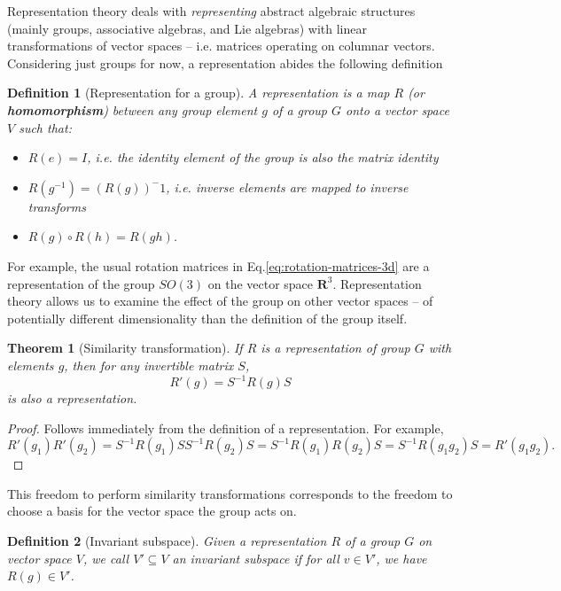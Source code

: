 \documentclass[11pt]{article}
\numberwithin{equation}{section}
\newtheorem{thm}{Theorem}[section]
\newtheorem{defn}{Definition}[section]
\begin{document}
Representation theory deals with \textit{representing} abstract algebraic structures (mainly groups, associative algebras, and Lie algebras) with linear transformations of vector spaces -- i.e. matrices operating on columnar vectors. Considering just groups for now, a representation abides the following definition
\begin{defn}[Representation for a group]
A representation is a map $R$ (or \textbf{homomorphism}) between any group element $g$ of a group $G$ onto a vector space $V$ such that:
\begin{itemize}[noitemsep]
\item $R(e) = I$, i.e. the identity element of the group is also the matrix identity
\item $R(g^{-1})=(R(g))^-1$, i.e. inverse elements are mapped to inverse transforms
\item $R(g) \circ R(h) = R(gh)$.
\end{itemize}
\end{defn}

For example, the usual rotation matrices in Eq.\eqref{eq:rotation-matrices-3d} are a representation of the group $SO(3)$ on the vector space $\textbf{R}^3$. Representation theory allows us to examine the effect of the group on other vector spaces -- of potentially different dimensionality than the definition of the group itself.

\begin{thm}[Similarity transformation]
If $R$ is a representation of group $G$ with elements $g$, then for any invertible matrix $S$,
\begin{equation}
R'(g) = S^{-1}R(g)S
\end{equation}
is also a representation.
\end{thm}
\begin{proof}
Follows immediately from the definition of a representation. For example,
\begin{equation}
R'(g_1)R'(g_2) = S^{-1}R(g_1)SS^{-1}R(g_2)S = S^{-1}R(g_1)R(g_2)S = S^{-1}R(g_1 g_2)S = R'(g_1 g_2).
\end{equation}
\end{proof}
This freedom to perform similarity transformations corresponds to the freedom to choose a basis for the vector space the group acts on.

\begin{defn}[Invariant subspace]
Given a representation $R$ of a group $G$ on vector space $V$, we call $V' \subseteq V$ an invariant subspace if for all $v \in V'$, we have $R(g) \in V'$.
\end{defn}
\end{document}
